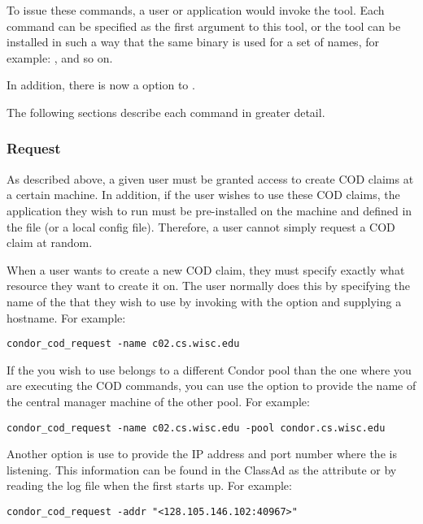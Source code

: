 To issue these commands, a user or application would invoke the 
 tool.
Each command can be specified as the first argument to this tool, or
the  tool can be installed in such a way that the same
binary is used for a set of names, for example: ,
 and so on.

In addition, there is now a  option to .

The following sections describe each command in greater detail.

\subsubsection{\label{sec:cod-claim-request}Request}

As described above, a given user must be granted access to create COD
claims at a certain machine.
In addition, if the user wishes to use these COD claims, the
application they wish to run must be pre-installed on the machine and
defined in the  file (or a local config file). 
Therefore, a user cannot simply request a COD claim at random.

When a user wants to create a new COD claim, they must specify exactly
what resource they want to create it on.
The user normally does this by specifying the name of the
 that they wish to use by invoking
 with the  option and supplying a
hostname.  For example:
\begin{verbatim}
condor_cod_request -name c02.cs.wisc.edu
\end{verbatim}
If the  you wish to use belongs to a different Condor
pool than the one where you are executing the COD commands, you can
use the  option to provide the name of the central manager
machine of the other pool.  For example:
\begin{verbatim}
condor_cod_request -name c02.cs.wisc.edu -pool condor.cs.wisc.edu
\end{verbatim}

Another option is use  to provide the IP address and port
number where the  is listening.
This information can be found in the  ClassAd as the
attribute  or by reading the log file when the
 first starts up.
For example:
\begin{verbatim}
condor_cod_request -addr "<128.105.146.102:40967>"
\end{verbatim}
  
